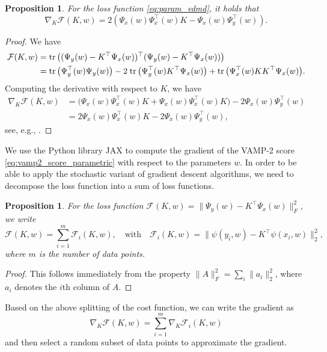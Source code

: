 \documentclass
[
    a4paper,
    DIV=11,
    abstract=true,
    11pt,
]
{scrartcl}
\newcommand{\ts}{\hspace*{0.1em}}                                %
\DeclareMathOperator{\tr}{tr}
\newtheorem{proposition}[theorem]{Proposition}
\theoremstyle{definition}
\begin{document}
\begin{proposition}\label{prop:edmd_grad}
For the loss function \eqref{eq:param_edmd}, it holds that $$\nabla_K \mathcal{F}(K, w) = 2(\Psi_x(w) \Psi_x^{\top}(w) K - \Psi_x(w) \Psi_y^{\top}(w)).$$
\end{proposition}
\begin{proof} We have
\begin{align*}
    \mathcal{F}(K, w) &= \tr\big(( \Psi_y(w) - K^{\top}\Psi_x(w))^{\top}( \Psi_y(w) - K^{\top}\Psi_x(w) )\big) \\
    &= \tr\big(\Psi_y^{\top}(w) \Psi_y(w) \big) - 2 \ts \tr \big(\Psi_y^{\top}(w) K^{\top}\Psi_x(w) \big)  + \tr\big( \Psi_x^{\top}(w) K K^{\top} \Psi_x(w)\big).
\end{align*}
Computing the derivative with respect to $K$, we have
\begin{align*}
\nabla_K \mathcal{F}(K, w) &= \big(\Psi_x(w) \Psi_x^{\top}(w) K  + \Psi_x(w) \Psi_x^{\top}(w) K \big) - 2\Psi_x(w)\Psi_y^{\top}(w) \\
&= 2 \Psi_x(w) \Psi_x^{\top}(w) K - 2\Psi_x(w) \Psi_y^{\top}(w),
\end{align*}
see, e.g., \cite{petersen2008matrix}.
\end{proof}

We use the Python library JAX \cite{jax2018github} to compute the gradient of the VAMP-2 score \eqref{eq:vamp2_score_parametric} with respect to the parameters $w$. In order to be able to apply the stochastic variant of gradient descent algorithms, we need to decompose the loss function into a sum of loss functions.

\begin{proposition}
For the loss function $\mathcal{F}(K, w) = \big \| \Psi_y(w) - K^{\top}\Psi_x(w) \big \|_F^2$, we write
\begin{equation*}
    \mathcal{F}(K, w) = \sum_{i=1}^m \mathcal{F}_i(K, w), \quad \text{with} \quad
    \mathcal{F}_i(K, w) = \big \|\psi(y_i, w) - K^{\top} \psi(x_i, w)\big \|_2^2,
\end{equation*}
where $m$ is the number of data points.
\end{proposition}
\begin{proof}
This follows immediately from the property $\|A\|_F^2 = \sum_i \|a_i\|_2^2$, where $a_i$ denotes the $i$th column of $A$.
\end{proof}
Based on the above splitting of the cost function, we can write the gradient as
\begin{equation*}
    \nabla_K \mathcal{F}(K, w) = \sum_{i=1}^m \nabla_K \mathcal{F}_i(K, w)
\end{equation*}
and then select a random subset of data points to approximate the gradient.
\end{document}
